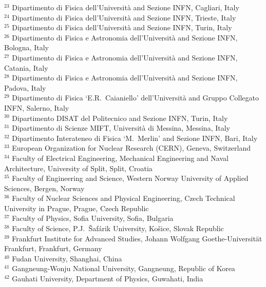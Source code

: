 \begin{flushleft}
$^{23}$ Dipartimento di Fisica dell'Universit\`{a} and Sezione INFN, Cagliari, Italy\\
$^{24}$ Dipartimento di Fisica dell'Universit\`{a} and Sezione INFN, Trieste, Italy\\
$^{25}$ Dipartimento di Fisica dell'Universit\`{a} and Sezione INFN, Turin, Italy\\
$^{26}$ Dipartimento di Fisica e Astronomia dell'Universit\`{a} and Sezione INFN, Bologna, Italy\\
$^{27}$ Dipartimento di Fisica e Astronomia dell'Universit\`{a} and Sezione INFN, Catania, Italy\\
$^{28}$ Dipartimento di Fisica e Astronomia dell'Universit\`{a} and Sezione INFN, Padova, Italy\\
$^{29}$ Dipartimento di Fisica `E.R.~Caianiello' dell'Universit\`{a} and Gruppo Collegato INFN, Salerno, Italy\\
$^{30}$ Dipartimento DISAT del Politecnico and Sezione INFN, Turin, Italy\\
$^{31}$ Dipartimento di Scienze MIFT, Universit\`{a} di Messina, Messina, Italy\\
$^{32}$ Dipartimento Interateneo di Fisica `M.~Merlin' and Sezione INFN, Bari, Italy\\
$^{33}$ European Organization for Nuclear Research (CERN), Geneva, Switzerland\\
$^{34}$ Faculty of Electrical Engineering, Mechanical Engineering and Naval Architecture, University of Split, Split, Croatia\\
$^{35}$ Faculty of Engineering and Science, Western Norway University of Applied Sciences, Bergen, Norway\\
$^{36}$ Faculty of Nuclear Sciences and Physical Engineering, Czech Technical University in Prague, Prague, Czech Republic\\
$^{37}$ Faculty of Physics, Sofia University, Sofia, Bulgaria\\
$^{38}$ Faculty of Science, P.J.~\v{S}af\'{a}rik University, Ko\v{s}ice, Slovak Republic\\
$^{39}$ Frankfurt Institute for Advanced Studies, Johann Wolfgang Goethe-Universit\"{a}t Frankfurt, Frankfurt, Germany\\
$^{40}$ Fudan University, Shanghai, China\\
$^{41}$ Gangneung-Wonju National University, Gangneung, Republic of Korea\\
$^{42}$ Gauhati University, Department of Physics, Guwahati, India\\

\end{flushleft}

